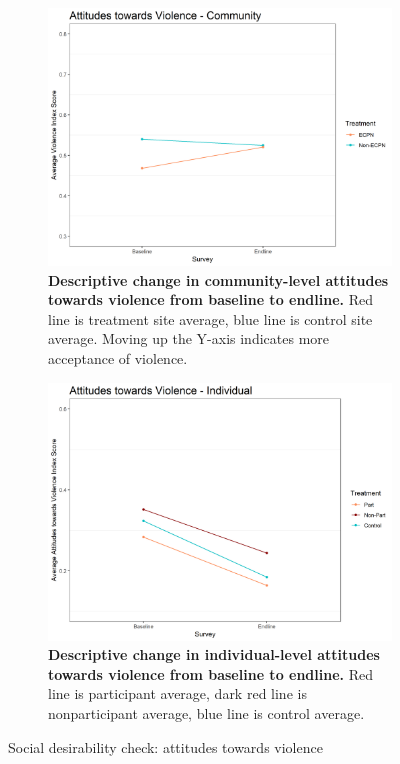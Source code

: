 \documentclass[11pt]{article}
\begin{document}
\begin{figure}[H]
    \begin{subfigure}[b]{.48\textwidth}
    \centering
        \includegraphics[width=\linewidth]{../../../figs/vioComm_plot.png}
        \caption{\textbf{Descriptive change in community-level attitudes towards violence from baseline to endline.} Red line is treatment site average, blue line is control site average.  Moving up the Y-axis indicates more acceptance of violence.}
        \label{fig:vio_comm}
    \end{subfigure}
    \hfill
    \begin{subfigure}[b]{.48\textwidth}
    \centering
        \includegraphics[width=\linewidth]{../../../figs/vioPan_plot.png}
        \caption{\textbf{Descriptive change in individual-level attitudes towards violence from baseline to endline.} Red line is participant average, dark red line is nonparticipant average, blue line is control average.}
        \label{fig:vio_ind}
    \end{subfigure}
    \caption{Social desirability check: attitudes towards violence}
\end{figure}
\end{document}
